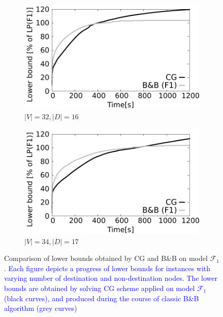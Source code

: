 \begin{figure}[!htb]
    \begin{subfigure}[b]{0.49\textwidth}
        \includegraphics[width=\textwidth]{lower-bound-32-16}
        \caption{$|V|=32, |D|=16$}
        \label{fig:cggr32-16}
    \end{subfigure}
    \hfill %
    \begin{subfigure}[b]{0.49\textwidth}
        \includegraphics[width=\textwidth]{lower-bound-34-17}
        \caption{$|V|=34, |D|=17$}
        \label{fig:cggr34-17}
    \end{subfigure}
  \caption{Comparison of lower bounds obtained by CG and B\&B on model $\mathcal{F}_1$.
	\textcolor{blue}{Each figure depicts a progress of lower bounds for instances with varying number of destination and non-destination nodes.
	The lower bounds are obtained by solving CG scheme applied on model $\mathcal{F}_1$ (black curves), and produced during the course of classic B\&B algorithm (grey curves)
}}
\end{figure}
